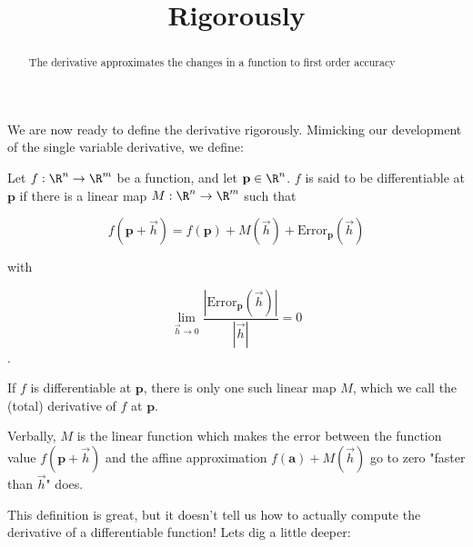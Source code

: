 \documentclass{ximera}
\title{Rigorously}
\begin{document}
	\begin{abstract}
		The derivative approximates the changes in a function to first order accuracy
	\end{abstract}
	
	We are now ready to define the derivative rigorously.  Mimicking our development of the single variable derivative, we define:

\begin{definition}
	Let $f :\R^n \to \R^m$ be a function, and let $\mathbf{p} \in \R^n$.  
	 $f$ is said to be differentiable at $\mathbf{p}$ if there is a linear map $M:\R^n \to \R^m$ such that 
		
		\[ f(\mathbf{p}+\vec{h}) = f(\mathbf{p}) + M(\vec{h})+ \text{Error}_{\mathbf{p}}(\vec{h})\]
		
		with
		
		\[ \lim_{\vec{h} \to 0} \frac{\left|\text{Error}_{\mathbf{p}}(\vec{h})\right|}{\left|\vec{h}\right|} = 0 \].
		
		If $f$ is differentiable at $\mathbf{p}$, there is only one such linear map $M$, which we call the (total) derivative of $f$ at $\mathbf{p}$.  
		
		Verbally,  $M$ is the linear function which makes the error between the function value $f(\mathbf{p}+\vec{h})$ and the affine approximation 
		$f(\mathbf{a})+M(\vec{h})$ go to zero "faster than $\vec{h}$" does.
\end{definition}

This definition is great, but it doesn't tell us how to actually compute the derivative of a differentiable function!  Lets dig a little deeper:
\end{document}
